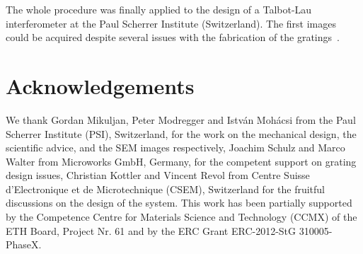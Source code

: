 \documentclass[a4paper]{spie}
\begin{document}
The whole procedure was finally applied to the design of a Talbot-Lau
interferometer at the Paul Scherrer Institute (Switzerland). The first
images could be acquired despite several issues with the fabrication of the
gratings~\cite{Thuering2014b}.

\section*{Acknowledgements}
We thank Gordan Mikuljan, Peter Modregger and István Mohácsi from the Paul
Scherrer Institute (PSI), Switzerland, for the
work on the mechanical design, the scientific advice, and the SEM images
respectively, Joachim Schulz and Marco Walter from
Microworks GmbH, Germany, for the competent support on grating design
issues, Christian Kottler and Vincent Revol from Centre Suisse
d'Electronique et de Microtechnique (CSEM), Switzerland for the fruitful
discussions on the design of the system. This work has been partially
supported by the Competence Centre for Materials Science and Technology
(CCMX) of the ETH Board, Project Nr. 61 and by the ERC Grant ERC-2012-StG 310005-PhaseX.



\end{document}
